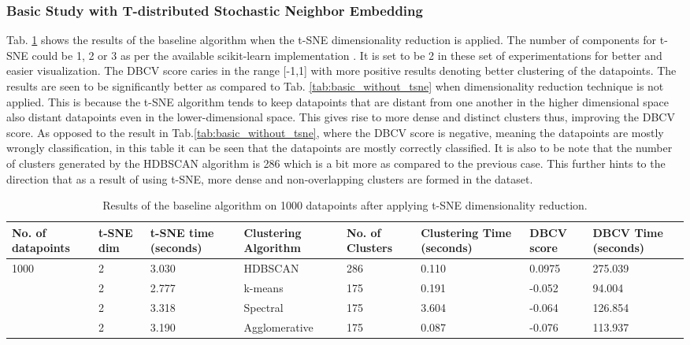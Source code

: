 \subsubsection{Basic Study with T-distributed Stochastic Neighbor Embedding}
Tab. \ref{tab:basic_with_tsne} shows the results of the baseline algorithm when the \ac{t-SNE} dimensionality reduction is applied. The number of components for \ac{t-SNE} could be 1, 2 or 3 as per the available scikit-learn implementation \cite{scikit-learn}. It is set to be 2 in these set of experimentations for better and easier visualization. The \ac{DBCV} score caries in the range [-1,1] with more positive results denoting better clustering of the datapoints. The results are seen to be significantly better as compared to Tab. \ref{tab:basic_without_tsne} when dimensionality reduction technique is not applied. This is because the \ac{t-SNE} algorithm tends to keep datapoints that are distant from one another in the higher dimensional space also distant datapoints even in the lower-dimensional space. This gives rise to more dense and distinct clusters thus, improving the \ac{DBCV} score. As opposed to the result in Tab.\ref{tab:basic_without_tsne}, where the \ac{DBCV} score is negative, meaning the datapoints are mostly wrongly classification, in this table it can be seen that the datapoints are mostly correctly classified. It is also to be note that the number of clusters generated by the \ac{HDBSCAN} algorithm is 286 which is a bit more as compared to the previous case. This further hints to the direction that as a result of using \ac{t-SNE}, more dense and non-overlapping clusters are formed in the dataset. 
\begin{table}[H]
    \setlength\extrarowheight{10pt}
    \caption{Results of the baseline algorithm on 1000 datapoints after applying \ac{t-SNE} dimensionality reduction. }
    \centering
    \begin{tabular}{|p{30pt}|p{30pt}|p{40pt}|p{60pt}|p{50pt}|p{40pt}|p{30pt}|p{40pt}|}
      \toprule
      No. of datapoints & \ac{t-SNE} dim	& \ac{t-SNE} time (seconds) & Clustering Algorithm & No. of Clusters & Clustering Time (seconds) & \ac{DBCV} score & \ac{DBCV} Time (seconds)\\
      \midrule
      \multirow{4}{30pt}{1000} & 2	& 3.030 & \ac{HDBSCAN}	& 286	& 0.110 & 0.0975	& 275.039 \\ \cline{2-8} 
                                & 2	& 2.777 &	k-means	& 175	& 0.191 & -0.052  	& 94.004 \\ \cline{2-8} 
                                & 2	& 3.318 & Spectral	& 175	& 3.604 & -0.064 	& 126.854 \\ \cline{2-8}
                                & 2	& 3.190 & Agglomerative	& 175	& 0.087 & -0.076	& 113.937 \\ 
      \bottomrule
    \end{tabular}
    \label{tab:basic_with_tsne}
\end{table}
